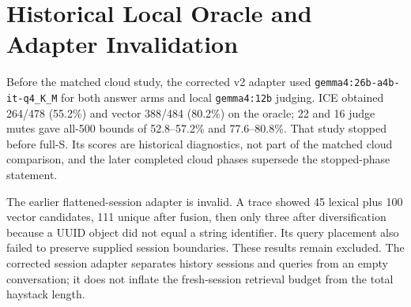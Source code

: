 \documentclass[twoside,11pt]{article}
\begin{document}
\FloatBarrier
\section{Historical Local Oracle and Adapter Invalidation}
\label{app:lme-history}
Before the matched cloud study, the corrected v2 adapter used \texttt{gemma4:26b-a4b-it-q4\_K\_M} for both answer arms and local \texttt{gemma4:12b} judging. ICE obtained 264/478 (55.2\%) and vector 388/484 (80.2\%) on the oracle; 22 and 16 judge mutes gave all-500 bounds of 52.8--57.2\% and 77.6--80.8\%. That study stopped before full-S. Its scores are historical diagnostics, not part of the matched cloud comparison, and the later completed cloud phases supersede the stopped-phase statement.

The earlier flattened-session adapter is invalid. A trace showed 45 lexical plus 100 vector candidates, 111 unique after fusion, then only three after diversification because a UUID object did not equal a string identifier. Its query placement also failed to preserve supplied session boundaries. These results remain excluded. The corrected session adapter separates history sessions and queries from an empty conversation; it does not inflate the fresh-session retrieval budget from the total haystack length.
\end{document}

